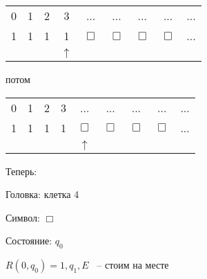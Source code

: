 \documentclass[russian]{lecture-notes}
\begin{document}
\begin{example}
\begin{table}[H]
	\centering
	\begin{tabular}{ *{9}{c} }
  \cline{1-9} 
    \multicolumn{1}{|c}{0} & 
    \multicolumn{1}{|c}{1} & 
    \multicolumn{1}{|c}{2} & 
    \multicolumn{1}{|c}{3} & 
	\multicolumn{1}{|c}{...} &     
	\multicolumn{1}{|c}{...} & 
	\multicolumn{1}{|c}{...} & 
	\multicolumn{1}{|c}{...} &     
    \multicolumn{1}{|c|}{...} \\
  \cline{1-9}
  \cline{1-9} 
    \multicolumn{1}{|c}{1} & 
    \multicolumn{1}{|c}{1} & 
    \multicolumn{1}{|c}{1} & 
    \multicolumn{1}{|c}{1} & 
	\multicolumn{1}{|c}{$\Box$} &     
	\multicolumn{1}{|c}{$\Box$} & 
	\multicolumn{1}{|c}{$\Box$} & 
	\multicolumn{1}{|c}{$\Box$} &     
    \multicolumn{1}{|c|}{...} \\
  \cline{1-9}  
       & & & $\uparrow$   
	\end{tabular}
	\end{table}

	потом
	
	\begin{table}[H]
	
	\centering
	\begin{tabular}{ *{9}{c} }
  \cline{1-9} 
    \multicolumn{1}{|c}{0} & 
    \multicolumn{1}{|c}{1} & 
    \multicolumn{1}{|c}{2} & 
    \multicolumn{1}{|c}{3} & 
	\multicolumn{1}{|c}{...} &     
	\multicolumn{1}{|c}{...} & 
	\multicolumn{1}{|c}{...} & 
	\multicolumn{1}{|c}{...} &     
    \multicolumn{1}{|c|}{...} \\
  \cline{1-9}
  \cline{1-9} 
    \multicolumn{1}{|c}{1} & 
    \multicolumn{1}{|c}{1} & 
    \multicolumn{1}{|c}{1} & 
    \multicolumn{1}{|c}{1} & 
	\multicolumn{1}{|c}{$\Box$} &     
	\multicolumn{1}{|c}{$\Box$} & 
	\multicolumn{1}{|c}{$\Box$} & 
	\multicolumn{1}{|c}{$\Box$} &     
    \multicolumn{1}{|c|}{...} \\
  \cline{1-9}  
       & & & & $\uparrow$   
	\end{tabular}
	\end{table}
	
	Теперь:
	
	Головка: клетка 4
	
	Символ: $\Box$
	
	Состояние: $q_0$
	
	$R(0, q_0) = 1, q_1, E$ ~-- стоим на месте
	
	\begin{table}[H]
	

\end{table}
\end{example}
\end{document}
